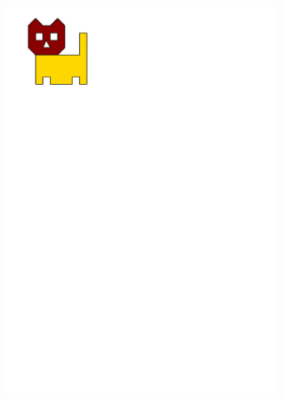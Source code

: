 \begin{figure}
\begin{subfigure}[b]{0.2\linewidth}
    \includegraphics[page=2,width=\linewidth]{figs/tricat.pdf}
    \caption{}\label{fig:pdffig:2}
  \end{subfigure}%
  \qquad %
  \begin{subfigure}[b]{0.2\linewidth}
    \centering

\end{subfigure}
\end{figure}
